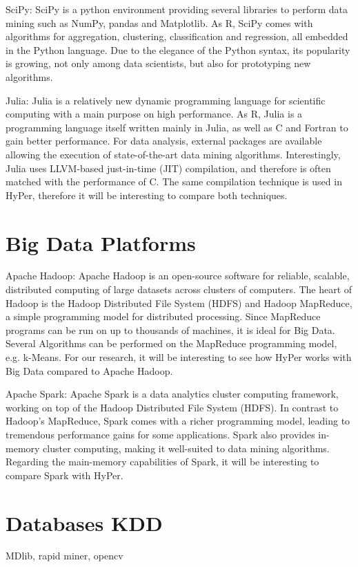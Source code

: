 SciPy: SciPy is a python environment providing several libraries to perform data mining such as NumPy, pandas and Matplotlib. As R, SciPy comes with algorithms for aggregation, clustering, classification and regression, all embedded in the Python language. Due to the elegance of the Python syntax, its popularity is growing, not only among data scientists, but also for prototyping new algorithms.

Julia: Julia is a relatively new dynamic programming language for scientific computing with a main purpose on high performance. As R, Julia is a programming language itself written mainly in Julia, as well as C and Fortran to gain better performance. For data analysis, external packages are available allowing the execution of state-of-the-art data mining algorithms. Interestingly, Julia uses LLVM-based just-in-time (JIT) compilation, and therefore is often matched with the performance of C. The same compilation technique is used in HyPer, therefore it will be interesting to compare both techniques.


\section{Big Data Platforms}

Apache Hadoop: Apache Hadoop is an open-source software for reliable, scalable, distributed computing of large datasets across clusters of computers. The heart of Hadoop is the Hadoop Distributed File System (HDFS) and Hadoop MapReduce, a simple programming model for distributed processing. Since MapReduce programs can be run on up to thousands of machines, it is ideal for Big Data. Several Algorithms can be performed on the MapReduce programming model, e.g. k-Means. For our research, it will be interesting to see how HyPer works with Big Data compared to Apache Hadoop.

Apache Spark: Apache Spark is a data analytics cluster computing framework, working on top of the Hadoop Distributed File System (HDFS). In contrast to Hadoop’s MapReduce, Spark comes with a richer programming model, leading to tremendous performance gains for some applications. Spark also provides in-memory cluster computing, making it well-suited to data mining algorithms. Regarding the main-memory capabilities of Spark, it will be interesting to compare Spark with HyPer.

\section{Databases KDD}
MDlib, rapid miner, opencv
